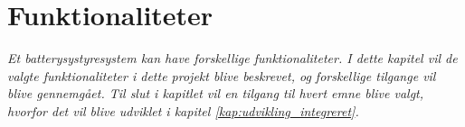 \chapter{Funktionaliteter}\label{kap:funktionaliteter}

\emph{Et batterysystyresystem kan have forskellige funktionaliteter. I dette kapitel vil de valgte funktionaliteter i dette projekt blive beskrevet, og forskellige tilgange vil blive gennemgået. Til slut i kapitlet vil en tilgang til hvert emne blive valgt, hvorfor det vil blive udviklet i kapitel \ref{kap:udvikling_integreret}.}


